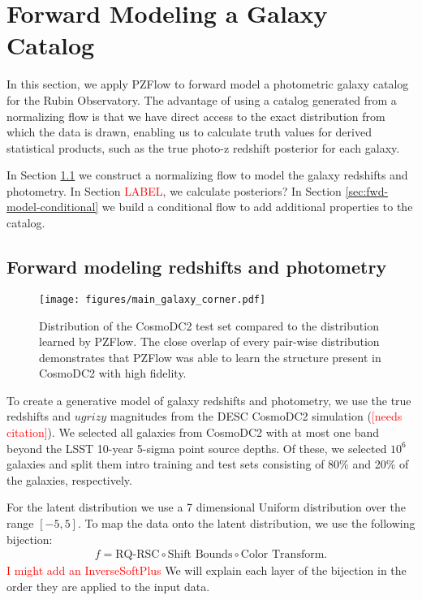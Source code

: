\documentclass[twocolumn]{aastex631}
\newcommand{\note}[1]{\textsf{\textcolor{red}{#1}}}
\newcommand{\needscite}{\note{[needs citation]}}
\begin{document}
\section{Forward Modeling a Galaxy Catalog}
\label{sec:galaxy-catalog}

In this section, we apply PZFlow to forward model a photometric galaxy catalog for the Rubin Observatory.
The advantage of using a catalog generated from a normalizing flow is that we have direct access to the exact distribution from which the data is drawn, enabling us to calculate truth values for derived statistical products, such as the true photo-z redshift posterior for each galaxy.

In Section \ref{sec:fwd-model} we construct a normalizing flow to model the galaxy redshifts and photometry.
In Section \note{LABEL}, we calculate posteriors?
In Section \ref{sec:fwd-model-conditional} we build a conditional flow to add additional properties to the catalog.

\subsection{Forward modeling redshifts and photometry}
\label{sec:fwd-model}

\begin{figure*}[t!]
    \begin{centering}
        \texttt{[image: figures/main\_galaxy\_corner.pdf]}
        \caption{
            Distribution of the CosmoDC2 test set compared to the distribution learned by PZFlow.
            The close overlap of every pair-wise distribution demonstrates that PZFlow was able to learn the structure present in CosmoDC2 with high fidelity.
        }
        \label{fig:main-corner}
    \end{centering}
\end{figure*}

To create a generative model of galaxy redshifts and photometry, we use the true redshifts and $ugrizy$ magnitudes from the DESC CosmoDC2 simulation (\needscite).
We selected all galaxies from CosmoDC2 with at most one band beyond the LSST 10-year 5-sigma point source depths.
Of these, we selected $10^6$ galaxies and split them intro training and test sets consisting of 80\% and 20\% of the galaxies, respectively.

For the latent distribution we use a 7 dimensional Uniform distribution over the range $[-5, 5]$.
To map the data onto the latent distribution, we use the following bijection:
\begin{align}
    f = \text{RQ-RSC} \circ \text{Shift Bounds} \circ \text{Color Transform}.
\end{align}
\note{I might add an InverseSoftPlus}
We will explain each layer of the bijection in the order they are applied to the input data.
\end{document}

